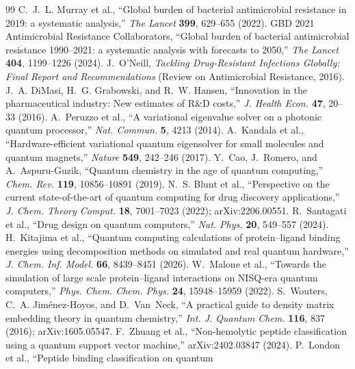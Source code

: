 \documentclass[10pt,twocolumn]{article}
\begin{document}
\begin{thebibliography}{99}\small
{} C.~J.~L. Murray et al., ``Global burden of bacterial antimicrobial
resistance in 2019: a systematic analysis,'' \emph{The Lancet} \textbf{399}, 629--655 (2022).
 GBD 2021 Antimicrobial Resistance Collaborators, ``Global burden
of bacterial antimicrobial resistance 1990--2021: a systematic analysis with forecasts
to 2050,'' \emph{The Lancet} \textbf{404}, 1199--1226 (2024).
 J.~O'Neill, \emph{Tackling Drug-Resistant Infections Globally:
Final Report and Recommendations} (Review on Antimicrobial Resistance, 2016).
 J.~A. DiMasi, H.~G. Grabowski, and R.~W. Hansen, ``Innovation in
the pharmaceutical industry: New estimates of R\&D costs,'' \emph{J. Health Econ.}
\textbf{47}, 20--33 (2016).
 A.~Peruzzo et al., ``A variational eigenvalue solver on a
photonic quantum processor,'' \emph{Nat. Commun.} \textbf{5}, 4213 (2014).
 A.~Kandala et al., ``Hardware-efficient variational quantum
eigensolver for small molecules and quantum magnets,'' \emph{Nature} \textbf{549},
242--246 (2017).
 Y.~Cao, J.~Romero, and A.~Aspuru-Guzik, ``Quantum chemistry in the
age of quantum computing,'' \emph{Chem. Rev.} \textbf{119}, 10856--10891 (2019).
 N.~S. Blunt et al., ``Perspective on the current state-of-the-art
of quantum computing for drug discovery applications,'' \emph{J. Chem. Theory Comput.}
\textbf{18}, 7001--7023 (2022); arXiv:2206.00551.
 R.~Santagati et al., ``Drug design on quantum computers,''
\emph{Nat. Phys.} \textbf{20}, 549--557 (2024).
 H.~Kitajima et al., ``Quantum computing calculations of
protein--ligand binding energies using decomposition methods on simulated and real
quantum hardware,'' \emph{J. Chem. Inf. Model.} \textbf{66}, 8439--8451 (2026).
 W.~Malone et al., ``Towards the simulation of large scale
protein--ligand interactions on NISQ-era quantum computers,'' \emph{Phys. Chem. Chem.
Phys.} \textbf{24}, 15948--15959 (2022).
 S.~Wouters, C.~A. Jim\'enez-Hoyos, and D.~Van~Neck, ``A practical
guide to density matrix embedding theory in quantum chemistry,'' \emph{Int. J. Quantum
Chem.} \textbf{116}, 837 (2016); arXiv:1605.05547.
 F.~Zhuang et al., ``Non-hemolytic peptide classification using a
quantum support vector machine,'' arXiv:2402.03847 (2024).
 P.~London et al., ``Peptide binding classification on quantum

\end{thebibliography}
\end{document}
